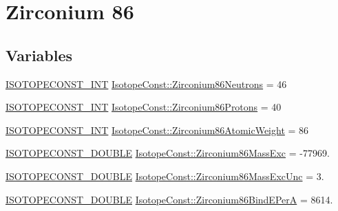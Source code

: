 \hypertarget{group___isotope_const-_zirconium-_zr86}{}\section{Zirconium 86}
\label{group___isotope_const-_zirconium-_zr86}
\subsection*{Variables}
\begin{DoxyCompactItemize}
\item 
\mbox{\hyperlink{group___isotope_const-_macros_ga5f18360b3e99483a35c32d789e62621c}{I\+S\+O\+T\+O\+P\+E\+C\+O\+N\+S\+T\+\_\+\+I\+NT}} \mbox{\hyperlink{group___isotope_const-_zirconium-_zr86_ga95b9bd5665231e8b9aa6d4bc764c62ff}{Isotope\+Const\+::\+Zirconium86\+Neutrons}} = 46
\item 
\mbox{\hyperlink{group___isotope_const-_macros_ga5f18360b3e99483a35c32d789e62621c}{I\+S\+O\+T\+O\+P\+E\+C\+O\+N\+S\+T\+\_\+\+I\+NT}} \mbox{\hyperlink{group___isotope_const-_zirconium-_zr86_ga2ca77d467d82a3b9893c17b06075992f}{Isotope\+Const\+::\+Zirconium86\+Protons}} = 40
\item 
\mbox{\hyperlink{group___isotope_const-_macros_ga5f18360b3e99483a35c32d789e62621c}{I\+S\+O\+T\+O\+P\+E\+C\+O\+N\+S\+T\+\_\+\+I\+NT}} \mbox{\hyperlink{group___isotope_const-_zirconium-_zr86_ga7638d12eca42c7117d8f9b9e2c038703}{Isotope\+Const\+::\+Zirconium86\+Atomic\+Weight}} = 86
\item 
\mbox{\hyperlink{group___isotope_const-_macros_ga8f45a7272ce02c0b4c65c44636ed719a}{I\+S\+O\+T\+O\+P\+E\+C\+O\+N\+S\+T\+\_\+\+D\+O\+U\+B\+LE}} \mbox{\hyperlink{group___isotope_const-_zirconium-_zr86_ga79c100ae698b5f92f9c1237f2c8d9fcb}{Isotope\+Const\+::\+Zirconium86\+Mass\+Exc}} = -\/77969.
\item 
\mbox{\hyperlink{group___isotope_const-_macros_ga8f45a7272ce02c0b4c65c44636ed719a}{I\+S\+O\+T\+O\+P\+E\+C\+O\+N\+S\+T\+\_\+\+D\+O\+U\+B\+LE}} \mbox{\hyperlink{group___isotope_const-_zirconium-_zr86_ga0184661f264f37594544e0fbbd2ff0c4}{Isotope\+Const\+::\+Zirconium86\+Mass\+Exc\+Unc}} = 3.
\item 
\mbox{\hyperlink{group___isotope_const-_macros_ga8f45a7272ce02c0b4c65c44636ed719a}{I\+S\+O\+T\+O\+P\+E\+C\+O\+N\+S\+T\+\_\+\+D\+O\+U\+B\+LE}} \mbox{\hyperlink{group___isotope_const-_zirconium-_zr86_ga3c11bc2b7118f8a920aff5090e9aa21f}{Isotope\+Const\+::\+Zirconium86\+Bind\+E\+PerA}} = 8614.
\item 

\end{DoxyCompactItemize}

